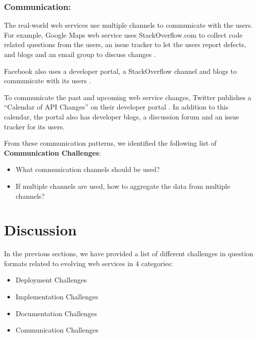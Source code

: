 \documentclass[runningheads,a4paper]{llncs}
\begin{document}
\subsubsection{Communication:}

The real-world web services use multiple channels to communicate with the users. For example, Google Maps web service uses StackOverflow.com to collect code related questions from the users, an issue tracker to let the users report defects, and blogs and an email group to discuss changes \cite{google_maps_forum}.

Facebook also uses a developer portal, a StackOverflow channel and blogs to communicate with its users \cite{facebook_stack_overflow}.

To communicate the past and upcoming web service changes, Twitter publishes a ``Calendar of API Changes'' on their developer portal \cite{twitter_calendar}. In addition to this calendar, the portal also has developer blogs, a discussion forum and an issue tracker for its users.

From these communication patterns, we identified the following list of \textbf{Communication Challenges}:

\begin{itemize}
  \item What communication channels should be used?
  \item If multiple channels are used, how to aggregate the data from multiple channels?
\end{itemize}



\section{Discussion} %
\label{sec:discussion}

In the previous sections, we have provided a list of different challenges in question formats related to evolving web services in 4 categories:

\begin{itemize}
  \item Deployment Challenges
  \item Implementation Challenges
  \item Documentation Challenges
  \item Communication Challenges
\end{itemize}
\end{document}
